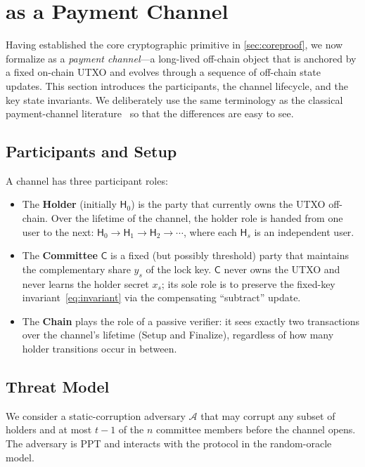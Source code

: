 \section{\thunderbolt as a Payment Channel}\label{sec:protocol}

Having established the core cryptographic primitive in \autoref{sec:coreproof}, we now formalize \thunderbolt as a \emph{payment channel}---a long-lived off-chain object that is anchored by a fixed on-chain UTXO and evolves through a sequence of off-chain state updates. This section introduces the participants, the channel lifecycle, and the key state invariants. We deliberately use the same terminology as the classical payment-channel literature~\cite{poon2016lightning, decker2015fast} so that the differences are easy to see.

\subsection{Participants and Setup}\label{sec:participants}

A \thunderbolt channel has three participant roles:

\begin{itemize}
  \item The \textbf{Holder} (initially $\mathsf{H}_0$) is the party that currently owns the UTXO off-chain. Over the lifetime of the channel, the holder role is handed from one user to the next: $\mathsf{H}_0 \to \mathsf{H}_1 \to \mathsf{H}_2 \to \cdots$, where each $\mathsf{H}_s$ is an independent user.
  \item The \textbf{Committee} $\mathsf{C}$ is a fixed (but possibly threshold) party that maintains the complementary share $y_s$ of the lock key. $\mathsf{C}$ never owns the UTXO and never learns the holder secret $x_s$; its sole role is to preserve the fixed-key invariant~\eqref{eq:invariant} via the compensating ``subtract'' update.
  \item The \textbf{Chain} plays the role of a passive verifier: it sees exactly two transactions over the channel's lifetime (Setup and Finalize), regardless of how many holder transitions occur in between.
\end{itemize}

\subsection{Threat Model}\label{sec:threat-model}

We consider a static-corruption adversary $\mathcal{A}$ that may corrupt any subset of holders and at most $t - 1$ of the $n$ committee members before the channel opens. The adversary is PPT and interacts with the protocol in the random-oracle model.

